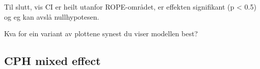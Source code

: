 Til slutt, vis CI er heilt utanfor ROPE-området, er effekten signifikant (p < 0.5) og eg kan avslå nullhypotesen.


Kva for ein variant av plottene synest du viser modellen best?





\subsection{CPH mixed effect}
%
%
%






